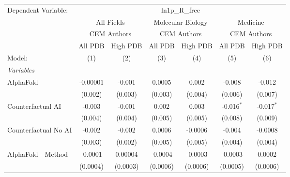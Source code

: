 \begingroup
\centering
\begin{tabular}{lcccccc}
   \tabularnewline \midrule \midrule
   Dependent Variable: & \multicolumn{6}{c}{ln1p\_R\_free}\\
 & \multicolumn{2}{c}{All Fields} & \multicolumn{2}{c}{Molecular Biology} & \multicolumn{2}{c}{Medicine} \\
\cmidrule(lr){2-3} \cmidrule(lr){4-5} \cmidrule(lr){6-7}
 & \multicolumn{2}{c}{CEM Authors} & \multicolumn{2}{c}{CEM Authors} & \multicolumn{2}{c}{CEM Authors} \\
\cmidrule(lr){2-3} \cmidrule(lr){4-5} \cmidrule(lr){6-7}
 & \multicolumn{1}{c}{All PDB} & \multicolumn{1}{c}{High PDB} & \multicolumn{1}{c}{All PDB} & \multicolumn{1}{c}{High PDB} & \multicolumn{1}{c}{All PDB} & \multicolumn{1}{c}{High PDB} \\
\cmidrule(lr){2-2} \cmidrule(lr){3-3} \cmidrule(lr){4-4} \cmidrule(lr){5-5} \cmidrule(lr){6-6} \cmidrule(lr){7-7}
   Model:                                                     & (1)             & (2)             & (3)       & (4)      & (5)            & (6)\\  
   \midrule
   \emph{Variables}\\
   AlphaFold                                                  & -0.00001        & -0.001          & 0.0005    & 0.002    & -0.008         & -0.012\\   
                                                              & (0.002)         & (0.003)         & (0.003)   & (0.004)  & (0.006)        & (0.007)\\   
   Counterfactual AI                                          & -0.003          & -0.001          & 0.002     & 0.003    & -0.016$^{*}$   & -0.017$^{*}$\\   
                                                              & (0.004)         & (0.004)         & (0.005)   & (0.005)  & (0.008)        & (0.009)\\   
   Counterfactual No AI                                       & -0.002          & -0.002          & 0.0006    & -0.0006  & -0.004         & -0.0008\\   
                                                              & (0.003)         & (0.002)         & (0.005)   & (0.005)  & (0.004)        & (0.004)\\   
   AlphaFold - Method                                         & -0.0001         & 0.00004         & -0.0004   & -0.0003  & -0.0003        & 0.0002\\   
                                                              & (0.0004)        & (0.0003)        & (0.0006)  & (0.0006) & (0.0005)       & (0.0006)\\   

\end{tabular}
